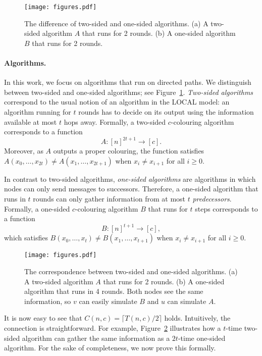 \documentclass[a4paper,11pt]{article}
\theoremstyle{remark}
\begin{document}
\begin{figure}[t]
    \centering
    \texttt{[image: figures.pdf]}
    \caption{The difference of two-sided and one-sided algorithms. (a) A two-sided algorithm $A$ that runs for 2 rounds. (b) A one-sided algorithm $B$ that runs for 2 rounds. \label{fig:algorithms}}
\end{figure}

\paragraph{Algorithms.}

In this work, we focus on algorithms that run on directed paths. We distinguish between two-sided and one-sided algorithms; see Figure~\ref{fig:algorithms}. \emph{Two-sided algorithms} correspond to the usual notion of an algorithm in the LOCAL model: an algorithm running for $t$ rounds has to decide on its output using the information available at most $t$ hops away. Formally, a two-sided $c$-colouring algorithm corresponds to a function
\[
 A \colon [n]^{2t+1} \to [c].
\]
Moreover, as $A$ outputs a proper colouring, the function satisfies $A(x_0, \dots, x_{2t}) \neq A(x_1, \dots, x_{2t+1})$ when $x_{i} \neq x_{i+1}$ for all $i \ge 0$.

In contrast to two-sided algorithms, \emph{one-sided algorithms} are algorithms in which nodes can only send messages to successors. Therefore, a one-sided algorithm that runs in $t$ rounds can only gather information from at most $t$ \emph{predecessors}. Formally, a one-sided $c$-colouring algorithm $B$ that runs for $t$ steps corresponds to a function
\[
 B \colon [n]^{t+1} \to [c],
\]
which satisfies $B(x_0, \dots, x_{t}) \neq B(x_1, \dots, x_{t+1})$ when $x_{i} \neq x_{i+1}$ for all $i \ge 0$.

\begin{figure}[t]
    \centering
    \texttt{[image: figures.pdf]}
    \caption{The correspondence between two-sided and one-sided algorithms. (a) A two-sided algorithm $A$ that runs for 2 rounds. (b) A one-sided algorithm that runs in 4 rounds. Both nodes see the same information, so $v$ can easily simulate $B$ and $u$ can simulate $A$. \label{fig:equivalence}}
\end{figure}

It is now easy to see that $C(n,c) = \lceil T(n,c)/2 \rceil$ holds. Intuitively, the connection is straightforward. For example, Figure~\ref{fig:equivalence} illustrates how a $t$-time two-sided algorithm can gather the same information as a $2t$-time one-sided algorithm. For the sake of completeness, we now prove this formally.
\end{document}
